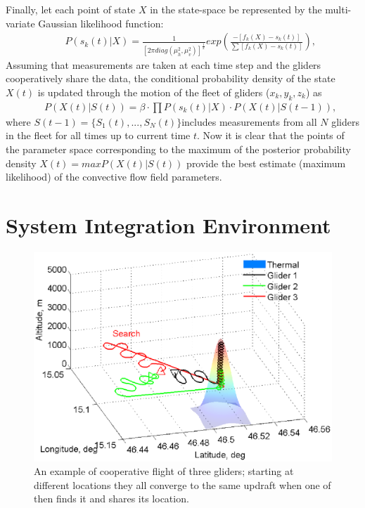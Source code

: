 \documentclass{ifacconf}
\begin{document}
Finally, let each point of state $X$ in the state-space be represented by the multi-variate Gaussian likelihood function:
\begin{eqnarray*}
    && P(s_k(t)\vert X)=\frac{1}{[2\pi diag(\mu^2_h,\mu^2_v)]^\frac{1}{2}}  exp( \frac{-[f_k(X)-s_k(t)]}{\sum [f_k(X)-s_k(t)] }),
    \label{eq:BayesProb}
\end{eqnarray*}
Assuming that measurements are taken at each time step and the gliders cooperatively share the data, the conditional probability density of the state $X(t)$ is updated through the motion of the fleet of gliders ($x_k,y_k,z_k$) as
\begin{eqnarray*}
    && P(X(t)\vert S(t))=\beta \cdot \prod P(s_k(t) \vert X)\cdot P(X(t) \vert S(t-1)),
    \label{eq:CondProb}
\end{eqnarray*}
where $S(t-1)=\{ S_1(t),...,S_N(t)\} $includes measurements from all $N$ gliders in the fleet for all times up to current time $t$. Now it is clear that the points of the parameter space corresponding to the maximum of the posterior probability density $X(t)=max P(X(t) \vert S(t))$ provide the best estimate (maximum likelihood) of the convective flow field parameters.

\section{System Integration Environment}
\label{sec:SysIntegration}

\begin{figure}[thpb]
  \centering
  \includegraphics[scale=0.45]{Figures/paths_cooperative_flight.eps}
  \caption{An example of cooperative flight of three gliders; starting at different locations they all converge to the same updraft when one of then finds it and shares its location.}
  \label{fig:CoopFlightPaths}
\end{figure}
\end{document}

